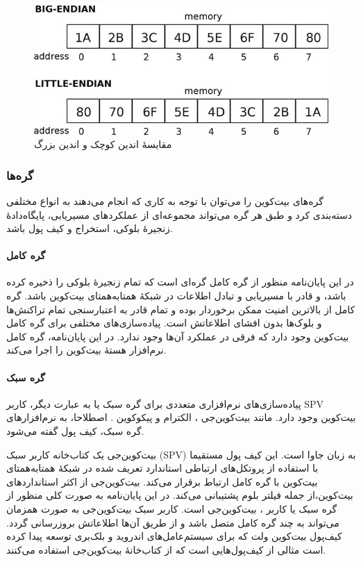 \begin{figure}[h]
	\centering
	\includegraphics[width=0.7\linewidth]{image/endian}
	\caption{مقایسهٔ اندین کوچک و اندین بزرگ\cite{Grochowski2020}}
	\label{fig:endian}
\end{figure}


\subsubsection{گره‌ها‌}
گره‌‌های بیت‌کوین را می‌توان با توجه به کاری که انجام می‌دهند به انواع مختلفی دسته‌بندی کرد و طبق \cite{Antonopoulos2016} هر گره می‌تواند مجموعه‌ای از عملکرد‌های مسیریابی، پایگاه‌دادهٔ زنجیره‌ٔ بلوکی، استخراج و کیف پول باشد.
\paragraph{گره کامل}
در این پایان‌نامه منظور از گره کامل گره‌ای است که تمام زنجیرهٔ بلوکی را ذخیره کرده باشد، و قادر با مسیریابی و تبادل اطلاعات در شبکهٔ همتا‌به‌همتای بیت‌کوین باشد. گره کامل از بالاترین امنیت ممکن برخوردار بوده و تمام قادر به اعتبارسنجی تمام تراکنش‌ها و بلوک‌ها بدون افشای اطلاعاتش است. پیاده‌سازی‌های مختلفی برای گره کامل بیت‌کوین وجود دارد که فرقی در عملکرد آن‌ها وجود ندارد. در این پایان‌نامه، گره کامل نرم‌افزار هستهٔ بیت‌کوین\cite{Bitcoincore.org} را اجرا می‌کند.

\paragraph{گره سبک}

پیاده‌سازی‌های نرم‌افزاری متعددی برای گره سبک یا به عبارت دیگر، کاربر SPV بیت‌کوین وجود دارد. مانند بیت‌کوین‌جی \cite{bitcoinj}، الکترام  
\cite{Electrum}
و پیکوکوین
\cite{Garzik}. 
اصطلاحا، به نرم‌افزار‌های گره سبک، کیف پول گفته می‌شود.

بیت‌کوین‌جی یک کتاب‌خانه کاربر سبک (SPV) به زبان جاوا  است. این کیف پول مستقیما با استفاده از پروتکل‌های ارتباطی استاندارد تعریف شده در شبکهٔ همتا‌به‌همتای بیت‌کوین \cite{P2P_dev,P2P_ref} با گره کامل ارتباط برقرار می‌کند. بیت‌کوین‌جی از اکثر استاندارد‌های بیت‌کوین،‌از جمله فیلتر بلوم \cite{Hearn2013}  پشتیبانی می‌کند. در این پایان‌نامه به صورت کلی منظور از گره سبک یا کاربر ، بیت‌کوین‌جی است. کاربر سبک بیت‌کوین‌جی به صورت همزمان می‌تواند به چند گره کامل متصل باشد و از طریق آن‌ها اطلاعاتش بروزرسانی گردد. کیف‌پول‌ 
بیت‌کوین ولت که برای سیستم‌عامل‌های اندروید و بلک‌بری توسعه پیدا کرده است مثالی از کیف‌پول‌هایی است که از کتاب‌خانهٔ بیت‌کوین‌جی استفاده می‌کنند.

